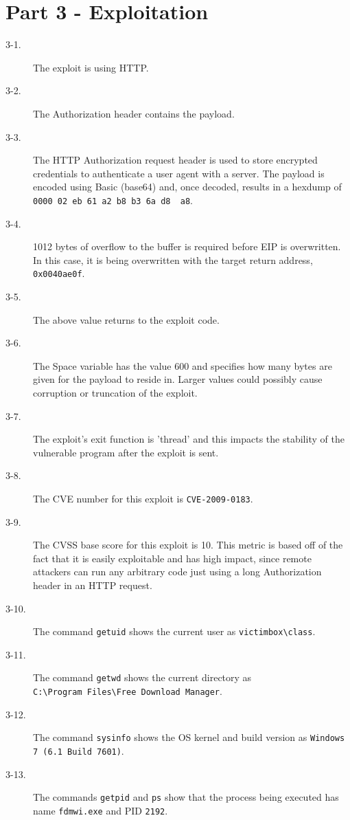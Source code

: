 \documentclass[11pt]{article}
\begin{document}
\section*{Part 3 - Exploitation}
\begin{description}
  \item[3-1.] The exploit is using HTTP.
  \item[3-2.] The Authorization header contains the payload.
  \item[3-3.] The HTTP Authorization request header is used to store encrypted credentials to authenticate a user agent with a
    server. The payload is encoded using Basic (base64) and, once decoded, results in a hexdump of
    \verb|0000 02 eb 61 a2 b8 b3 6a d8  a8|.
  \item[3-4.] 1012 bytes of overflow to the buffer is required before EIP is overwritten. In this case, it is being overwritten
    with the target return address, \verb|0x0040ae0f|.
  \item[3-5.] The above value returns to the exploit code.
  \item[3-6.] The Space variable has the value 600 and specifies how many bytes are given for the payload to reside in. Larger
    values could possibly cause corruption or truncation of the exploit.
  \item[3-7.] The exploit's exit function is 'thread' and this impacts the stability of the vulnerable program after the exploit
    is sent.~\cite{metasploit}
  \item[3-8.] The CVE number for this exploit is \verb|CVE-2009-0183|.
  \item[3-9.] The CVSS base score for this exploit is 10. This metric is based off of the fact that it is easily exploitable
    and has high impact, since remote attackers can run any arbitrary code just using a long Authorization header in an HTTP
    request.~\cite{nvd}
  \item[3-10.] The command \verb|getuid| shows the current user as \verb|victimbox\class|.
  \item[3-11.] The command \verb|getwd| shows the current directory as \\\verb|C:\Program Files\Free Download Manager|.
  \item[3-12.] The command \verb|sysinfo| shows the OS kernel and build version as \verb|Windows 7 (6.1 Build 7601)|.
  \item[3-13.] The commands \verb|getpid| and \verb|ps| show that the process being executed has name \verb|fdmwi.exe| and PID \verb|2192|.

\end{description}
\end{document}
